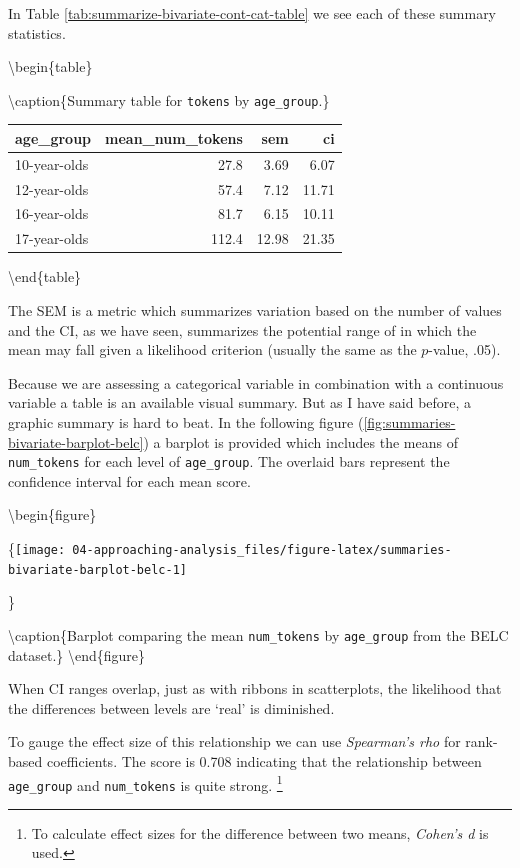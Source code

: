 \documentclass[
]{article}
\begin{document}
In Table \ref{tab:summarize-bivariate-cont-cat-table} we see each of these summary statistics.

\textbackslash begin\{table\}

\textbackslash caption\{\label{tab:summarize-bivariate-cont-cat-table}Summary table for \texttt{tokens} by \texttt{age\_group}.\}
\centering

\begin{tabular}[t]{lrrr}
\toprule
age\_group & mean\_num\_tokens & sem & ci\\
\midrule
10-year-olds & 27.8 & 3.69 & 6.07\\
12-year-olds & 57.4 & 7.12 & 11.71\\
16-year-olds & 81.7 & 6.15 & 10.11\\
17-year-olds & 112.4 & 12.98 & 21.35\\
\bottomrule
\end{tabular}

\textbackslash end\{table\}

The SEM is a metric which summarizes variation based on the number of values and the CI, as we have seen, summarizes the potential range of in which the mean may fall given a likelihood criterion (usually the same as the \(p\)-value, .05).

Because we are assessing a categorical variable in combination with a continuous variable a table is an available visual summary. But as I have said before, a graphic summary is hard to beat. In the following figure (\ref{fig:summaries-bivariate-barplot-belc}) a barplot is provided which includes the means of \texttt{num\_tokens} for each level of \texttt{age\_group}. The overlaid bars represent the confidence interval for each mean score.

\textbackslash begin\{figure\}

\{\centering \texttt{[image: 04-approaching-analysis\_files/figure-latex/summaries-bivariate-barplot-belc-1]}

\}

\textbackslash caption\{Barplot comparing the mean \texttt{num\_tokens} by \texttt{age\_group} from the BELC dataset.\}\label{fig:summaries-bivariate-barplot-belc}
\textbackslash end\{figure\}

When CI ranges overlap, just as with ribbons in scatterplots, the likelihood that the differences between levels are `real' is diminished.

To gauge the effect size of this relationship we can use \emph{Spearman's rho} for rank-based coefficients. The score is 0.708 indicating that the relationship between \texttt{age\_group} and \texttt{num\_tokens} is quite strong. \footnote{To calculate effect sizes for the difference between two means, \emph{Cohen's d} is used.}
\end{document}
